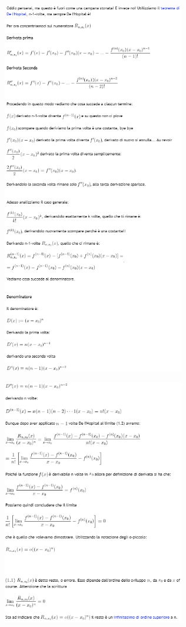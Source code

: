 \documentclass[a4paper, 9pt]{report}
\begin{document}
\begin{figure}[h!]
    \includegraphics[width=300px]{../dim/taylorpeano2.PNG}
\end{figure}
\newpage
\begin{figure}[h!]
    \includegraphics[width=300px]{../dim/taylorpeano3.PNG}
\end{figure}
\newpage
\end{document}
